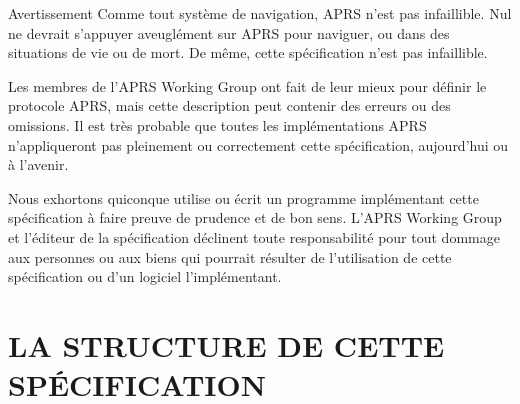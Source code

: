 \begin{aprssideblock}{Avertissement}
Comme tout système de navigation, APRS n'est pas infaillible. Nul ne
devrait s'appuyer aveuglément sur APRS pour naviguer, ou dans des
situations de vie ou de mort. De même, cette spécification n'est pas
infaillible.

Les membres de l'APRS Working Group ont fait de leur mieux pour définir
le protocole APRS, mais cette description peut contenir des erreurs ou
des omissions. Il est très probable que toutes les implémentations APRS
n'appliqueront pas pleinement ou correctement cette spécification,
aujourd'hui ou à l'avenir.

Nous exhortons quiconque utilise ou écrit un programme implémentant
cette spécification à faire preuve de prudence et de bon sens. L'APRS
Working Group et l'éditeur de la spécification déclinent toute
responsabilité pour tout dommage aux personnes ou aux biens qui pourrait
résulter de l'utilisation de cette spécification ou d'un logiciel
l'implémentant.
\end{aprssideblock}

\clearpage

\section*{LA STRUCTURE DE CETTE
SPÉCIFICATION}\label{structure-de-cette-spuxe9cification}

